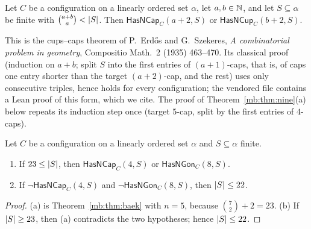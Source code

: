 \begin{theorem}\label{mb:thm:capcup}
Let $C$ be a configuration on a linearly ordered set $\alpha$, let $a,b\in\mathbb N$, and let $S\subseteq\alpha$ be finite with
$\binom{a+b}{a}<\lvert S\rvert$. Then $\mathsf{HasNCap}_C(a+2,S)$ or $\mathsf{HasNCup}_C(b+2,S)$.
\end{theorem}

\begin{remark}\label{mb:rem:capcup}
This is the cups--caps theorem of P.~Erd\H{o}s and G.~Szekeres, \emph{A combinatorial problem in geometry}, Compositio
Math.\ 2 (1935) 463--470. Its classical proof (induction on $a+b$; split $S$ into the first entries of $(a+1)$-caps,
that is, of caps one entry shorter than the target $(a+2)$-cap, and the rest) uses only consecutive triples, hence holds
for every configuration; the vendored file contains a Lean proof of this form, which we cite. The proof of
Theorem~\ref{mb:thm:nine}(a) below repeats its induction step once (target $5$-cap, split by the first entries of
$4$-caps).
\end{remark}

\begin{lemma}\label{mb:lem:baek8}
Let $C$ be a configuration on a linearly ordered set $\alpha$ and $S\subseteq\alpha$ finite.
\begin{enumerate}[label=(\alph*)]
\item If $23\le\lvert S\rvert$, then $\mathsf{HasNCap}_C(4,S)$ or $\mathsf{HasNGon}_C(8,S)$.
\item If $\neg\mathsf{HasNCap}_C(4,S)$ and $\neg\mathsf{HasNGon}_C(8,S)$, then $\lvert S\rvert\le22$.
\end{enumerate}
\end{lemma}

\begin{proof}
(a) is Theorem~\ref{mb:thm:baek} with $n=5$, because $\binom{7}{2}+2=23$. (b) If $\lvert S\rvert\ge23$, then (a) contradicts the
two hypotheses; hence $\lvert S\rvert\le22$.
\end{proof}

